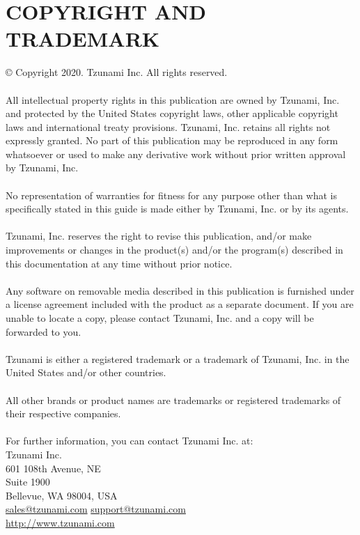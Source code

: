 \chapter{COPYRIGHT AND TRADEMARK}
© Copyright 2020. Tzunami Inc. All rights reserved.\\ \\
All intellectual property rights in this publication are owned by Tzunami, Inc. and protected by the United States copyright laws, other applicable copyright laws and international treaty provisions. Tzunami, Inc. retains all rights not expressly granted. No part of this publication may be reproduced in any form whatsoever or used to make any derivative work without prior written approval by Tzunami, Inc.
\\ \\
No representation of warranties for fitness for any purpose other than what is specifically stated in this guide is made either by Tzunami, Inc. or by its agents.
\\ \\
Tzunami, Inc. reserves the right to revise this publication, and/or make improvements or changes in the product(s) and/or the program(s) described in this documentation at any time without prior notice.
\\ \\
Any software on removable media described in this publication is furnished under a license agreement included with the product as a separate document. If you are unable to locate a copy, please contact Tzunami, Inc. and a copy will be forwarded to you.
\\ \\
Tzunami is either a registered trademark or a trademark of Tzunami, Inc. in the United States and/or other countries.
\\\\
All other brands or product names are trademarks or registered trademarks of their respective companies.
\\ \\
For further information, you can contact Tzunami Inc. at: 
\\
Tzunami Inc. \\
601 108th Avenue, NE \\
Suite 1900\\
Bellevue, WA 98004, USA\\
\href{mailto: sales@tzunami.com}{sales@tzunami.com}
\href{mailto: support@tzunami.com}{support@tzunami.com}\\
\url{http://www.tzunami.com}